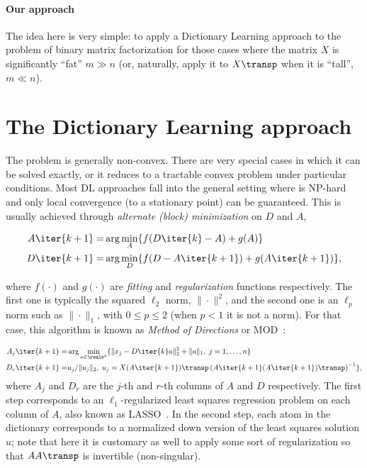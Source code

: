 \documentclass[a4paper]{IEEEtran}
\begin{document}
\paragraph{Our approach} The idea here is very simple: to apply a Dictionary Learning approach to the problem of binary matrix factorization for those cases where the matrix $X$ is significantly ``fat'' $m \gg n$ (or, naturally, apply it to $X\transp$ when it is ``tall'', $m \ll n$). 

\section{The Dictionary Learning approach}

The problem  is generally non-convex. There are very special cases in which it can be solved exactly, or it reduces to a tractable convex problem under particular conditions. Most DL approaches fall into the general setting where  is NP-hard and only local convergence (to a stationary point) can be guaranteed. This is usually achieved through \emph{alternate (block) minimization} on $D$ and $A$,

\begin{eqnarray}
A\iter{k+1} =& \arg\min_{A} \{ f(D\iter{k}-A) + g(A) \} \\
D\iter{k+1} =& \arg\min_{D} \{ f(D-A\iter{k+1}) + g(A\iter{k+1}) \},
\label{eq:dl}
\end{eqnarray}

where $f(\cdot)$ and $g(\cdot)$ are \emph{fitting} and \emph{regularization} functions respectively. The first one is typically the squared $\ell_2$ norm, $\|\cdot\|^2$, and the second one is an $\ell_p$ norm such as $\|\cdot\|_1$, with $0 \leq p \leq 2$ (when $p < 1$ it is not a norm). For that case, this algorithm is known as \emph{Method of Directions} or MOD~\cite{mod}:

\begin{eqnarray}
A_j\iter{k+1} =& \arg\min_{a \in \reals^p} \{ \|x_j - D\iter{k}a \|_2^2 + \|a\|_1,  \; j=1,\ldots,n \} \\
D_r\iter{k+1} =& u_j/\|u_j\|_2,\;u_j = X(A\iter{k+1})\transp\left(A\iter{k+1}(A\iter{k+1})\transp\right)^{-1} \}, 
\label{eq:mod}
\end{eqnarray}
where $A_j$ and $D_r$ are the $j$-th and $r$-th columns of $A$ and $D$ respectively. The first step corresponds to an $\ell_1$-regularized least squares regression problem on each column of $A$, also known as LASSO~\cite{lasso}.
In the second step, each atom in the dictionary corresponds to a normalized down version of the least squares solution $u$; note that here it is customary as well to apply some sort of regularization so that $AA\transp$ is invertible (non-singular).
\end{document}
